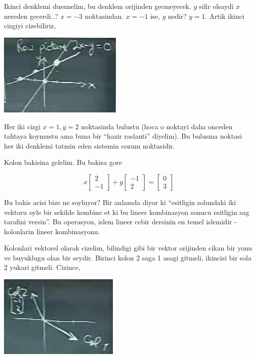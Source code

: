 \documentclass[12pt,fleqn]{article}\usepackage{../common}
\begin{document}
Ikinci denklemi dusunelim, bu denklem orijinden gecmeyecek. $y$ sifir
olsaydi $x$ nereden gecerdi..? $x=-3$ noktasindan. $x=-1$ ise, $y$ nedir?
$y=1$. Artik ikinci cizgiyi cizebiliriz,

\includegraphics[height=4cm]{1_02.png}

Her iki cizgi $x=1,y=2$ noktasinda bulustu (hoca o noktayi daha onceden
tahtaya koymustu ama buna bir ``hazir raslanti'' diyelim). Bu bulusma
noktasi her iki denklemi tatmin eden sistemin cozum noktasidir.

Kolon bakisina gelelim. Bu bakisa gore

$$ 
x
\left[\begin{array}{r}
2 \\
-1
\end{array}\right]
+
y
\left[\begin{array}{r}
-1 \\
2
\end{array}\right]
=
\left[\begin{array}{r}
0 \\
3
\end{array}\right]
$$

Bu bakis acisi bize ne soyluyor? Bir anlamda diyor ki ``esitligin solundaki
iki vektoru oyle bir sekilde kombine et ki bu lineer kombinasyon sonucu
esitligin sag tarafini versin''. Bu operasyon, islem lineer cebir dersinin
en temel islemidir - kolonlarin lineer kombinasyonu. 

Kolonlari vektorel olarak cizelim, bilindigi gibi bir vektor orijinden
cikan bir yonu ve buyuklugu olan bir seydir. Birinci kolon 2 saga 1 asagi
gitmeli, ikincisi bir sola 2 yukari gitmeli. Cizince,

\includegraphics[height=4cm]{1_03.png}
\end{document}
